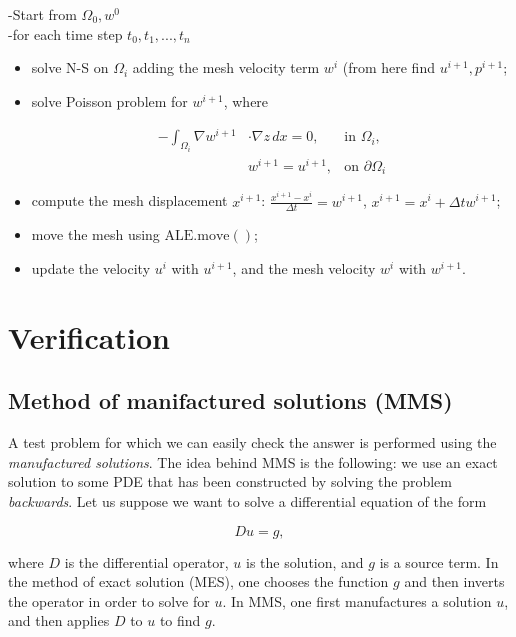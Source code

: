 \documentclass[11pt,a4paper,titlepage]{report}
\begin{document}
-Start from $\Omega_0, w^0$ \\
-for each time step $t_0, t_1, ..., t_n$
\begin{itemize}
\item solve N-S on $\Omega_i$ adding the mesh velocity term $w^i$ (from here find $u^{i+1}, p^{i+1}$;
\item solve Poisson problem for $w^{i+1}$, where 

\[
\begin{aligned}
-  \int_{\Omega_i} \nabla w^{i+1} & \cdot \nabla z \, dx = 0, & \text{in } \Omega_i, \\
& w^{i+1} = u^{i+1}, & \text{on } \partial \Omega_i
\end{aligned}
\]

\item compute the mesh displacement $x^{i+1}$: $\frac{x^{i+1} - x^{i}}{\Delta t} = w^{i+1}$, $x^{i+1} = x^{i} + \Delta t w^{i+1}$;
\item move the mesh using $\mathrm{ALE.move()}$;
\item update the velocity $u^i$ with $u^{i+1}$, and the mesh velocity $w^i$ with $w^{i+1}$.

\end{itemize}


\chapter{Verification}

\section{Method of manifactured solutions (MMS)}

A test problem for which we can easily check the answer is performed using the \textit{manufactured solutions}. The idea behind MMS is the following: we use an exact solution to some PDE that has been constructed by solving the problem \textit{backwards}. Let us suppose we want to solve a differential equation of the form 

\[
Du = g,
\]

where $D$ is the differential operator, $u$ is the solution, and $g$ is a source term. In the method of exact solution (MES), one chooses the function $g$ and then inverts the operator in order to solve for $u$. In MMS, one first manufactures a solution $u$, and then applies $D$ to $u$ to find $g$. \\
\end{document}
